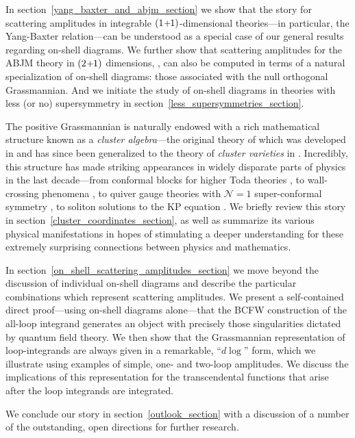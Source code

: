 \documentclass[12pt,hyperref,compress]{JHEP3}
\newcommand{\pl}{\hspace{0.5pt}\text{{\small+}}\hspace{-0.5pt}}
\begin{document}
\newpage
In \mbox{section \ref{yang_baxter_and_abjm_section}} we show that the story for scattering amplitudes in integrable $(1\pl1)$-dimensional theories---in particular, the Yang-Baxter relation---can be understood as a special case of our general results regarding on-shell diagrams. We further show that scattering amplitudes for the ABJM theory in $(2\pl1)$ dimensions, \cite{Aharony:2008ug}, can also be computed in terms of a natural specialization of on-shell diagrams: those associated with the null orthogonal Grassmannian. And we initiate the study of on-shell diagrams in theories with less (or no) supersymmetry in \mbox{section \ref{less_supersymmetries_section}}.


The positive Grassmannian is naturally endowed with a rich mathematical structure known as a {\it cluster algebra}---the original theory of which was developed in \cite{FZ} and has since been generalized to the theory of {\it cluster varieties} in \cite{FG2,FG3}. Incredibly, this structure has made striking appearances in widely disparate parts of physics in the last decade---from conformal blocks for higher Toda theories \cite{FG1,FG4}, to wall-crossing phenomena \cite{KS,Gaiotto:2011tf}, to quiver gauge theories with $\mathcal{N}\!=\!1$ super-conformal symmetry \cite{Xie:2012dw,Franco:2012mm,Xie:2012mr,Xie:2012jd,Heckman:2012jh,Franco:2012wv}, to soliton solutions to the KP equation \cite{Kodama:2011ht,Kodama:2011iq,Kodama:2012zx}. We briefly review this story in \mbox{section \ref{cluster_coordinates_section}}, as well as summarize its various physical manifestations in hopes of stimulating a deeper understanding for these extremely surprising connections between physics and mathematics.


In \mbox{section \ref{on_shell_scattering_amplitudes_section}} we move beyond the discussion of individual on-shell diagrams and describe the particular combinations which represent scattering amplitudes. We present a self-contained direct proof---using on-shell diagrams alone---that the BCFW construction of the all-loop integrand generates an object with precisely those singularities dictated by quantum field theory. We then show that the Grassmannian representation of loop-integrands are always given in a remarkable, ``$d\!\log$'' form, which we illustrate using examples of simple, one- and two-loop amplitudes. We discuss the implications of this representation for the transcendental functions that arise after the loop integrands are integrated.

We conclude our story in \mbox{section \ref{outlook_section}} with a discussion of a number of the outstanding, open directions for further research.
\end{document}
